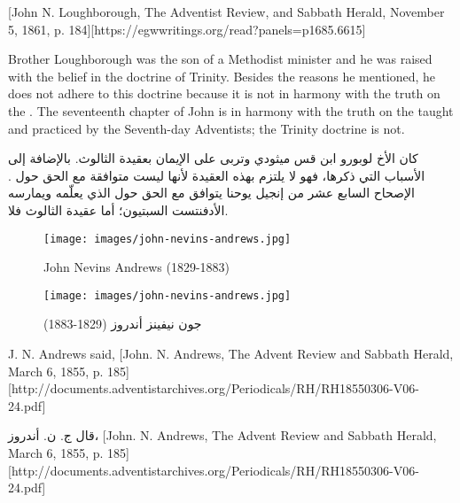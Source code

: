 [John N. Loughborough, The Adventist Review, and Sabbath Herald, November 5, 1861, p. 184][https://egwwritings.org/read?panels=p1685.6615]


Brother Loughborough was the son of a Methodist minister and he was raised with the belief in the doctrine of Trinity. Besides the reasons he mentioned, he does not adhere to this doctrine because it is not in harmony with the truth on the . The seventeenth chapter of John is in harmony with the truth on the  taught and practiced by the Seventh-day Adventists; the Trinity doctrine is not.


كان الأخ لوبورو ابن قس ميثودي وتربى على الإيمان بعقيدة الثالوث. بالإضافة إلى الأسباب التي ذكرها، فهو لا يلتزم بهذه العقيدة لأنها ليست متوافقة مع الحق حول . الإصحاح السابع عشر من إنجيل يوحنا يتوافق مع الحق حول  الذي يعلّمه ويمارسه الأدفنتست السبتيون؛ أما عقيدة الثالوث فلا.


\begin{figure}[hp]
    \centering
    \texttt{[image: images/john-nevins-andrews.jpg]}
    \caption*{John Nevins Andrews (1829-1883)}
    \label{fig:j-n-andrews}
\end{figure}


\begin{figure}[hp]
    \centering
    \texttt{[image: images/john-nevins-andrews.jpg]}
    \caption*{جون نيفينز أندروز (1829-1883)}
    \label{fig:j-n-andrews}
\end{figure}


J. N. Andrews said, [John. N. Andrews, The Advent Review and Sabbath Herald, March 6, 1855, p. 185][http://documents.adventistarchives.org/Periodicals/RH/RH18550306-V06-24.pdf]


قال ج. ن. أندروز، [John. N. Andrews, The Advent Review and Sabbath Herald, March 6, 1855, p. 185][http://documents.adventistarchives.org/Periodicals/RH/RH18550306-V06-24.pdf]


